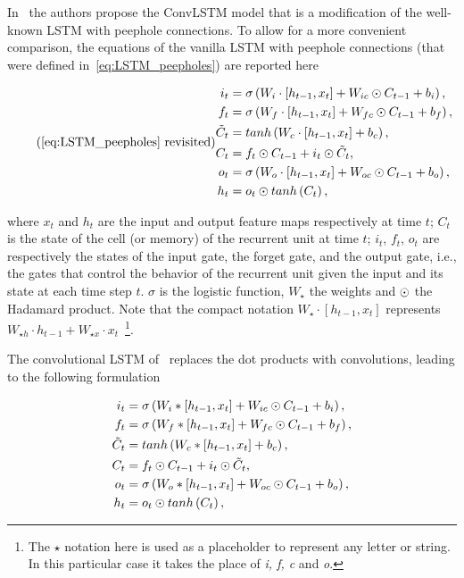 In~\cite{ShiCWYWW15} the authors propose the ConvLSTM model that is a
modification of the well-known LSTM with peephole connections. To allow for a
more convenient comparison, the equations of the vanilla LSTM with peephole
connections (that were defined in~\autoref{eq:LSTM_peepholes}) are reported
here

\begin{equation*}\tag{\ref{eq:LSTM_peepholes} revisited}
\begin{split}
    i_t &= \sigma\left(W_i \cdot \left[h_{t-1}, x_t\right] +
        W_{ic} \hadamard C_{t-1} + b_i \right),\\
    f_t &= \sigma\left(W_f \cdot \left[h_{t-1}, x_t\right] +
        W_{fc} \hadamard C_{t-1} + b_f \right),\\
    \tilde C_t &= tanh \left(W_c \cdot \left[h_{t-1}, x_t\right] + b_c \right),\\
    C_t &= f_t \hadamard C_{t-1} + i_t \hadamard \tilde C_t,\\
    o_t &= \sigma\left(W_o \cdot \left[h_{t-1}, x_t\right] +
        W_{oc} \hadamard C_{t-1} + b_o \right),\\
    h_t &= o_t \hadamard tanh \left(C_t\right),
\end{split}
\end{equation*}

\noindent where $x_t$ and $h_t$ are the input and output feature maps
respectively at time $t$; $C_t$ is the state of the cell (or memory) of the
recurrent unit at time $t$; $i_t$, $f_t$, $o_t$ are respectively the states of
the input gate, the forget gate, and the output gate, i.e., the gates that
control the behavior of the recurrent unit given the input and its state at
each time step $t$. $\sigma$ is the logistic function, $W_{\star}$ the weights
and $\odot$ the Hadamard product. Note that the compact notation
$W_\star \cdot [h_{t-1}, x_t]$ represents $W_{\star h} \cdot h_{t-1} +
W_{\star x} \cdot x_t$~\footnote{The $\star$ notation here is used as a
placeholder to represent any letter or string. In this particular case it
takes the place of \textit{i, f, c} and \textit{o}.}.

The convolutional LSTM of~\cite{ShiCWYWW15} replaces the dot products with
convolutions, leading to the following formulation

\begin{equation}
\begin{split}
    i_t &= \sigma\left(W_i * \left[h_{t-1}, x_t\right] +
        W_{ic} \odot C_{t-1} + b_i \right),\\
    f_t &= \sigma\left(W_f * \left[h_{t-1}, x_t\right] +
        W_{fc} \odot C_{t-1} + b_f \right),\\
    \tilde C_t &= tanh \left(W_c * \left[h_{t-1}, x_t\right] + b_c \right),\\
    C_t &= f_t \odot C_{t-1} + i_t \odot \tilde C_t,\\
    o_t &= \sigma\left(W_o * \left[h_{t-1}, x_t\right] +
        W_{oc} \odot C_{t-1} + b_o \right),\\
    h_t &= o_t \odot tanh \left(C_t\right),
\end{split}
\end{equation}

